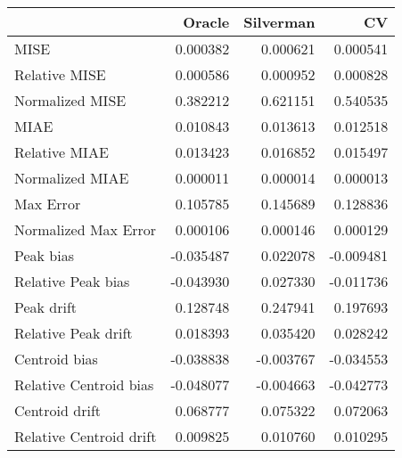 \begin{tabular}{lrrr}
  \hline
 & Oracle & Silverman & CV \\ 
  \hline
MISE & 0.000382 & 0.000621 & 0.000541 \\ 
  Relative MISE & 0.000586 & 0.000952 & 0.000828 \\ 
  Normalized MISE & 0.382212 & 0.621151 & 0.540535 \\ 
  MIAE & 0.010843 & 0.013613 & 0.012518 \\ 
  Relative MIAE & 0.013423 & 0.016852 & 0.015497 \\ 
  Normalized MIAE & 0.000011 & 0.000014 & 0.000013 \\ 
  Max Error & 0.105785 & 0.145689 & 0.128836 \\ 
  Normalized Max Error & 0.000106 & 0.000146 & 0.000129 \\ 
  Peak bias & -0.035487 & 0.022078 & -0.009481 \\ 
  Relative Peak bias & -0.043930 & 0.027330 & -0.011736 \\ 
  Peak drift & 0.128748 & 0.247941 & 0.197693 \\ 
  Relative Peak drift & 0.018393 & 0.035420 & 0.028242 \\ 
  Centroid bias & -0.038838 & -0.003767 & -0.034553 \\ 
  Relative Centroid bias & -0.048077 & -0.004663 & -0.042773 \\ 
  Centroid drift & 0.068777 & 0.075322 & 0.072063 \\ 
  Relative Centroid drift & 0.009825 & 0.010760 & 0.010295 \\ 
   \hline
\end{tabular}
